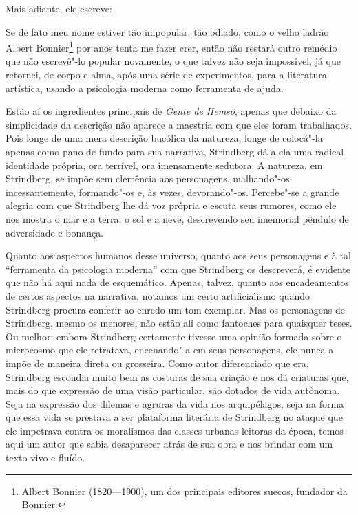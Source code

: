 Mais adiante, ele escreve:

\begin{hedraquote}
Se de fato meu nome estiver tão impopular, tão odiado, como o
velho ladrão Albert Bonnier\footnote{ Albert Bonnier (1820---1900), um 
dos principais editores suecos, fundador da Bonnier.} por anos tenta me fazer crer, então não restará outro
remédio que não escrevê"-lo popular novamente, o que talvez não seja  %
impossível, já que retornei, de corpo e alma, após uma série de
experimentos, para a literatura artística, usando a psicologia
moderna como ferramenta de ajuda.
\end{hedraquote}

Estão aí os ingredientes principais de \textit{Gente de Hemsö},
apenas que debaixo da simplicidade da descrição não aparece a
maestria com que eles foram trabalhados. Pois longe de uma mera
descrição bucólica da natureza, longe de colocá"-la apenas como pano de
fundo para sua narrativa, Strindberg dá a ela uma radical identidade
própria, ora terrível, ora imensamente sedutora. A natureza, em
Strindberg, se impõe sem clemência aos personagens, malhando"-os
incessantemente, formando"-os e, às vezes, devorando"-os. Percebe"-se a
grande alegria com que Strindberg lhe dá voz própria e escuta seus
rumores, como ele nos mostra o mar e a terra, o sol e a neve, descrevendo
seu imemorial pêndulo de adversidade e bonança. 

Quanto aos aspectos humanos desse universo, quanto aos seus personagens
e à tal “ferramenta da psicologia moderna” com que Strindberg
os descreverá, é evidente que não há aqui nada de esquemático. Apenas,
talvez, quanto aos encadeamentos de certos aspectos na narrativa,
notamos um certo artificialismo quando Strindberg procura conferir ao enredo 
um tom exemplar. Mas os personagens de Strindberg, mesmo os
menores, não estão ali como fantoches para quaisquer teses. Ou melhor:
embora Strindberg certamente tivesse uma opinião formada sobre o
microcosmo que ele retratava, encenando"-a em seus personagens, ele
nunca a impõe de maneira direta ou grosseira. Como autor diferenciado
que era, Strindberg escondia muito bem as costuras de sua criação e nos
dá criaturas que, mais do que expressão de uma visão particular, são
dotados de vida autônoma. Seja na expressão dos dilemas e agruras da
vida nos arquipélagos, seja na forma que essa vida se prestava a ser
plataforma literária de Strindberg no ataque que ele impetrava contra
os moralismos das classes urbanas leitoras da época, temos aqui um
autor que sabia desaparecer atrás de sua obra e nos brindar com um
texto vivo e fluído. 

